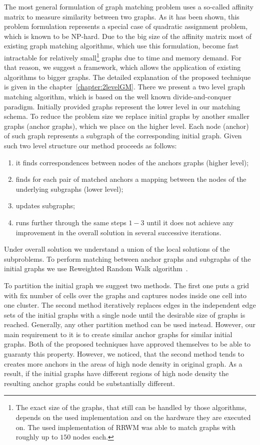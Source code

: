 The most general formulation of graph matching problem uses a so-called affinity matrix to measure similarity between two graphs. 
As it has been shown, this problem formulation represents a special case of quadratic assignment problem, which is known to be NP-hard. Due to the big size of the affinity matrix most of existing graph matching algorithms, which use this formulation, become fast intractable for relatively small\footnote{The exact size of the graphs, that still can be handled by those algorithms, depends on the used implementation and on the hardware they are executed on. The used implementation of RRWM was able to match graphs with roughly up to $150$ nodes each.} graphs due to time and memory demand. For that reason, we suggest a framework, which allows the application of existing algorithms to bigger graphs. The detailed explanation of the proposed technique is given in the chapter~\ref{chapter:2levelGM}. There we present a two level graph matching algorithm, which is based on the well known divide-and-conquer paradigm. Initially provided graphs represent the lower level in our matching schema. To reduce the problem size we replace initial graphs by another smaller graphs (anchor graphs), which we place on the higher level. Each node (anchor) of such graph represents a subgraph of the corresponding initial graph. Given such two level structure our method proceeds as follows:
\begin{enumerate}
\item it finds correspondences between nodes of the anchors graphs (higher level);
\item finds for each pair of matched anchors a mapping between the nodes of the underlying subgraphs (lower level);
\item updates subgraphs;
\item runs further through the same steps $1-3$ until it does not achieve any improvement in the overall solution in several successive iterations.
\end{enumerate}
Under overall solution we understand a union of the local solutions of the subproblems. To perform matching between anchor graphs and subgraphs of the initial graphs we use Reweighted Random Walk algorithm~\cite{Cho2010_RRWM}.

To partition the initial graph we suggest two methods. The first one puts a grid with fix number of cells over the graphs and captures nodes inside one cell into one cluster. The second method iteratively replaces edges in the independent edge sets of the initial graphs with a single node until the desirable size of graphs is reached. Generally, any other partition method can be used instead. However, our main requirement to it is to create similar anchor graphs for similar initial graphs. Both of the proposed techniques have approved themselves to be able to guaranty this property. However, we noticed, that the second method tends to creates more anchors in the areas of high node density in original graph. As a result, if the initial graphs have different regions of high node density the resulting anchor graphs could be substantially different.

